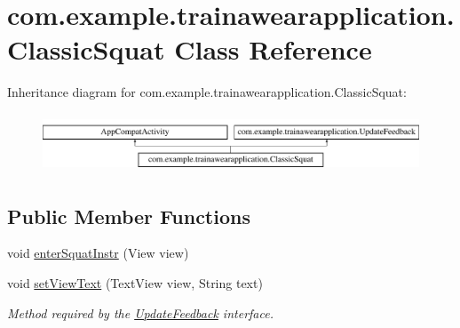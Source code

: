 \hypertarget{classcom_1_1example_1_1trainawearapplication_1_1_classic_squat}{}\section{com.\+example.\+trainawearapplication.\+Classic\+Squat Class Reference}
\label{classcom_1_1example_1_1trainawearapplication_1_1_classic_squat}
Inheritance diagram for com.\+example.\+trainawearapplication.\+Classic\+Squat\+:\begin{figure}[H]
\begin{center}
\leavevmode
\includegraphics[height=1.766562cm]{classcom_1_1example_1_1trainawearapplication_1_1_classic_squat}
\end{center}
\end{figure}
\subsection*{Public Member Functions}
\begin{DoxyCompactItemize}
\item 
void \mbox{\hyperlink{classcom_1_1example_1_1trainawearapplication_1_1_classic_squat_af11bf43a5c57edf97320d8662fc343a1}{enter\+Squat\+Instr}} (View view)
\item 
void \mbox{\hyperlink{classcom_1_1example_1_1trainawearapplication_1_1_classic_squat_ab193e39e2f1255fd88d0508cfe7a63ff}{set\+View\+Text}} (Text\+View view, String text)
\begin{DoxyCompactList}\small\item\em Method required by the \mbox{\hyperlink{interfacecom_1_1example_1_1trainawearapplication_1_1_update_feedback}{Update\+Feedback}} interface. \end{DoxyCompactList}\end{DoxyCompactItemize}

